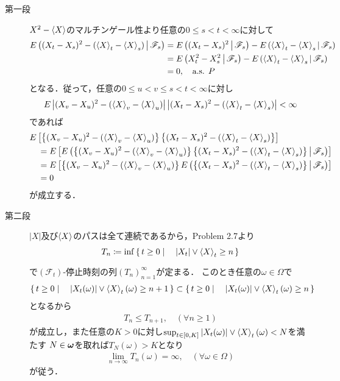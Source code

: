 	\begin{prf}\mbox{}
		\begin{description}
			\item[第一段]
				$X^2 - \inprod<X>$のマルチンゲール性より任意の$0 \leq s < t < \infty$に対して
				\begin{align}
					\cexp{(X_t - X_s)^2 - (\inprod<X>_t - \inprod<X>_s)}{\mathscr{F}_s}
					&= \cexp{(X_t - X_s)^2}{\mathscr{F}_s} - \cexp{\inprod<X>_t - \inprod<X>_s}{\mathscr{F}_s} \\
					&= \cexp{X_t^2 - X_s^2}{\mathscr{F}_s} - \cexp{\inprod<X>_t - \inprod<X>_s}{\mathscr{F}_s} \\
					&= 0,
					\quad \mbox{a.s. $P$}
				\end{align}
				となる．従って，任意の$0 \leq u < v \leq s < t < \infty$に対し
				\begin{align}
					E\left|(X_v - X_u)^2 - (\inprod<X>_v - \inprod<X>_u)\right|
					\left|(X_t - X_s)^2 - (\inprod<X>_t - \inprod<X>_s)\right| < \infty
				\end{align}
				であれば
				\begin{align}
					&E \left[\left\{(X_v - X_u)^2 - (\inprod<X>_v - \inprod<X>_u)\right\}
						\left\{(X_t - X_s)^2 - (\inprod<X>_t - \inprod<X>_s)\right\}\right] \\
					&\quad= E \left[\cexp{\left\{(X_v - X_u)^2 - (\inprod<X>_v - \inprod<X>_u)\right\}
						\left\{(X_t - X_s)^2 - (\inprod<X>_t - \inprod<X>_s)\right\}}{\mathscr{F}_s} \right] \\
					&\quad= E \left[\left\{(X_v - X_u)^2 - (\inprod<X>_v - \inprod<X>_u)\right\}
						\cexp{\left\{(X_t - X_s)^2 - (\inprod<X>_t - \inprod<X>_s)\right\}}{\mathscr{F}_s} \right] \\
					&\quad= 0
				\end{align}
				が成立する．
				
			\item[第二段]
				$|X|$及び$\inprod<X>$のパスは全て連続であるから，Problem 2.7より
				\begin{align}
					T_n \coloneqq \inf{}{\Set{t \geq 0}{|X_t| \vee \inprod<X>_t \geq n}}
				\end{align}
				で$(\mathscr{F}_t)$-停止時刻の列$(T_n)_{n=1}^\infty$が定まる．
				このとき任意の$\omega \in \Omega$で
				\begin{align}
					\Set{t \geq 0}{|X_t(\omega)| \vee \inprod<X>_t(\omega) \geq n+1}
					\subset \Set{t \geq 0}{|X_t(\omega)| \vee \inprod<X>_t(\omega) \geq n}
				\end{align}
				となるから
				\begin{align}
					T_n \leq T_{n+1}, \quad (\forall n \geq 1)
				\end{align}
				が成立し，また任意の$K > 0$に対し$\sup{t \in [0,K]}{|X_t(\omega)| \vee \inprod<X>_t(\omega)} < N$を満たす
				$N \in {\boldsymbol \omega}$を取れば$T_N(\omega) > K$となり
				\begin{align}
					\lim_{n \to \infty} T_n(\omega) = \infty, \quad (\forall \omega \in \Omega)
					\label{eq:chapter_1_theorem_5_8_1}
				\end{align}
				が従う．
				

\end{description}
\end{prf}
